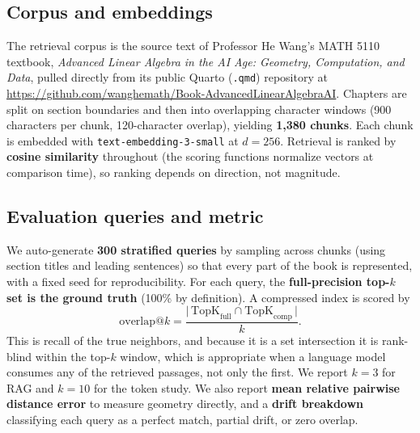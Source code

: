 \documentclass[11pt]{article}
\begin{document}
\subsection{Corpus and embeddings}

The retrieval corpus is the source text of Professor He Wang's MATH 5110 textbook, \emph{Advanced Linear Algebra in the AI Age: Geometry, Computation, and Data}, pulled directly from its public Quarto (\texttt{.qmd}) repository at \url{https://github.com/wanghemath/Book-AdvancedLinearAlgebraAI}. Chapters are split on section boundaries and then into overlapping character windows (900 characters per chunk, 120-character overlap), yielding \textbf{1{,}380 chunks}. Each chunk is embedded with \texttt{text-embedding-3-small} at $d = 256$. Retrieval is ranked by \textbf{cosine similarity} throughout (the scoring functions normalize vectors at comparison time), so ranking depends on direction, not magnitude.

\subsection{Evaluation queries and metric}

We auto-generate \textbf{300 stratified queries} by sampling across chunks (using section titles and leading sentences) so that every part of the book is represented, with a fixed seed for reproducibility. For each query, the \textbf{full-precision top-$k$ set is the ground truth} (100\% by definition). A compressed index is scored by
\begin{equation}
\text{overlap@}k = \frac{\bigl|\,\mathrm{TopK}_{\text{full}} \cap \mathrm{TopK}_{\text{comp}}\,\bigr|}{k}.
\end{equation}
This is recall of the true neighbors, and because it is a set intersection it is rank-blind within the top-$k$ window, which is appropriate when a language model consumes any of the retrieved passages, not only the first. We report $k = 3$ for RAG and $k = 10$ for the token study. We also report \textbf{mean relative pairwise distance error} to measure geometry directly, and a \textbf{drift breakdown} classifying each query as a perfect match, partial drift, or zero overlap.
\end{document}
